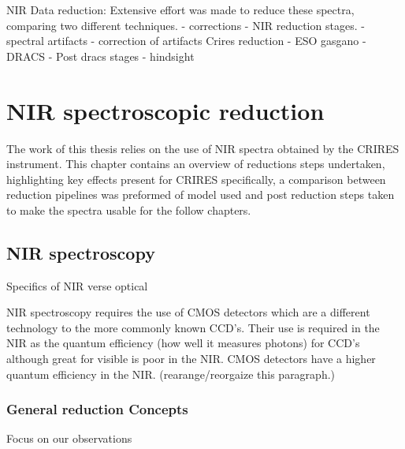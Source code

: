 %


NIR Data reduction:
Extensive effort was made to reduce these spectra, comparing two different techniques.
- corrections
- NIR reduction stages.
- spectral artifacts
- correction of artifacts
Crires reduction
- ESO gasgano
- DRACS
- Post dracs stages
- hindsight 



\chapter{NIR spectroscopic reduction}  %
\label{cha:reduction} 

The work of this thesis relies on the use of NIR spectra obtained by the CRIRES instrument. This chapter contains an overview of reductions steps undertaken, highlighting key effects present for CRIRES specifically, a comparison between reduction pipelines was preformed of model used and post reduction steps taken to make the spectra usable for the follow chapters.  

\section{NIR spectroscopy}
Specifics of NIR verse optical


NIR spectroscopy requires the use of CMOS detectors which are a different technology to the more commonly known CCD's. Their use is required in the NIR as the quantum efficiency (how well it measures photons) for CCD's although great for visible is poor in the NIR. CMOS detectors have a higher quantum efficiency in the NIR. 
\change(rearange/reorgaize this paragraph.)


\subsection{General reduction Concepts}
\label{subsec:nir_reduction}

Focus on our observations

